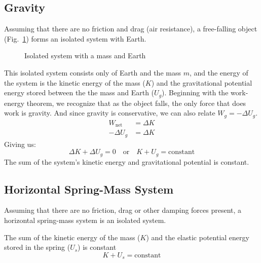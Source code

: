 \documentclass[11pt]{article}
\begin{document}
\subsection{Gravity}
Assuming that there are no friction and drag (air resistance), a free-falling
object (Fig.~\ref{fig:earth}) forms an isolated system with Earth. 
\begin{figure}[ht]
  \centering
  \caption{Isolated system with a mass and Earth}
  \label{fig:earth}
\end{figure}
This isolated system consists only of Earth and the mass $m$, and the energy of
the system is the kinetic energy of the mass ($K$) and the gravitational
potential energy stored between the the mass and Earth ($U_g$). Beginning with
the work-energy theorem, we recognize that as the object falls, the only force
that does work is gravity. And since gravity is conservative, we can also
relate $W_g=-\Delta U_g$.
\begin{align*}
  W_\text{net} &=\Delta K\\
  -\Delta U_g &=\Delta K
\end{align*}
Giving us:
\begin{equation}
  \boxed{
    \Delta K + \Delta U_g=0
  }
  \quad\text{or}\quad
  \boxed{
    K+U_g=\text{constant}
  }
\end{equation}
The sum of the system's kinetic energy and gravitational potential is constant.

\subsection{Horizontal Spring-Mass System}
Assuming that there are no friction, drag or other damping forces present, a
horizontal spring-mass system is an isolated system.
\begin{figure}[ht]
  \centering
\end{figure}
The sum of the kinetic energy of the mass ($K$) and the elastic potential
energy stored in the spring ($U_s$) is constant
\begin{equation}
  K+U_s=\text{constant}
\end{equation}
\end{document}
